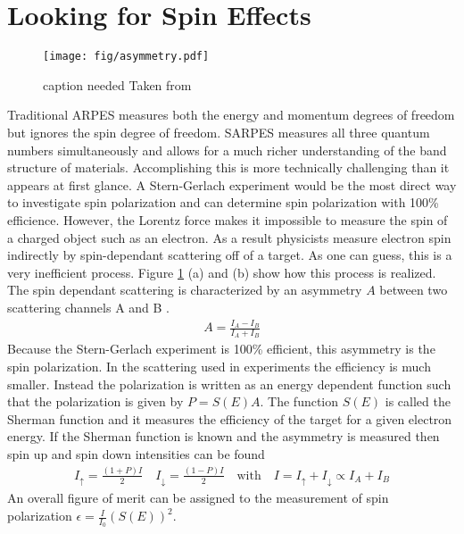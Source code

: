 \documentclass[12pt]{article}
\begin{document}
\section{Looking for Spin Effects}
\begin{figure}[h]
  \centering
  \texttt{[image: fig/asymmetry.pdf]}
  \caption[should I put this here?]
  {caption needed Taken from \cite{Okuda-Kimura}}
  \label{fig:asymmetry}
\end{figure}
Traditional ARPES measures both the energy and momentum degrees of freedom but ignores the spin degree of freedom.
SARPES measures all three quantum numbers simultaneously and allows for a much richer understanding of the band structure of materials.
Accomplishing this is more technically challenging than it appears at first glance.
A Stern-Gerlach experiment would be the most direct way to investigate spin polarization and can determine spin polarization with 100\% efficience.
However, the Lorentz force makes it impossible to measure the spin of a charged object such as an electron.
As a result physicists measure electron spin indirectly by spin-dependant scattering off of a target.
As one can guess, this is a very inefficient process.
Figure \ref{fig:asymmetry} (a) and (b) show how this process is realized.
The spin dependant scattering is characterized by an asymmetry $A$ between two scattering channels A and B \cite{Okuda-Kimura}.
\begin{align}
  A=\frac{I_A-I_B}{I_A+I_B}
\end{align}
Because the Stern-Gerlach experiment is 100\% efficient, this asymmetry is the spin polarization.
In the scattering used in experiments the efficiency is much smaller.
Instead the polarization is written as an energy dependent function such that the polarization is given by $P=S(E)A$.
The function $S(E)$ is called the Sherman function and it measures the efficiency of the target for a given electron energy.
If the Sherman function is known and the asymmetry is measured then spin up and spin down intensities can be found
\begin{align}
  I_{\uparrow}=\frac{(1+P)I}{2}\quad I_{\downarrow}=\frac{(1-P)I}{2}\quad \text{with}\quad I=I_{\uparrow}+I_{\downarrow}\propto I_A+I_B
\end{align}
An overall figure of merit can be assigned to the measurement of spin polarization $\epsilon=\frac{I}{I_0}(S(E))^2$.
\end{document}
